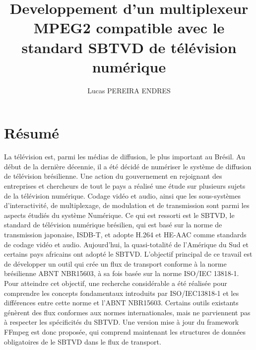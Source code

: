 \documentclass[12pt,a4paper]{article}
\author{Lucas PEREIRA ENDRES}
\title{Developpement d'un multiplexeur MPEG2 compatible avec le standard SBTVD de télévision numérique}
\begin{document}
\TBfrontcover
\newpage
 
\newpage
\section*{Résumé}
La télévision est, parmi les médias de diffusion, le plus important au Brésil. Au début de la dernière décennie, il a été décidé de numériser le système de diffusion de télévision brésilienne. Une action du gouvernement en rejoignant des entreprises et chercheurs de tout le pays a réalisé une étude sur plusieurs sujets de la télévision
numérique. Codage vidéo et audio, ainsi que les sous-systèmes d’interactivité, de multiplexage, de modulation et de transmission sont parmi les aspects étudiés du
système Numérique. Ce qui est ressorti est le SBTVD, le standard de télévision numérique brésilien, qui est basé sur la norme de transmission japonaise, ISDB-T, et
adopte H.264 et HE-AAC comme standards de codage vidéo et audio. Aujourd’hui, la quasi-totalité de l’Amérique du Sud et certains pays africains ont adopté le SBTVD.
L’objectif principal de ce travail est de développer un outil qui crée un flux de transport conforme à la norme brésilienne ABNT NBR15603, à sa fois basée sur la
norme ISO/IEC 13818-1. Pour atteindre cet objectif, une recherche considérable a été réalisée pour comprendre les concepts fondamentaux introduits par ISO/IEC13818-1
et les différences entre cette norme et l’ABNT NBR15603. Certains outils existants génèrent des flux conformes aux normes internationales, mais ne parviennent pas à respecter les spécificités du SBTVD. Une version mise à jour du framework FFmpeg est donc proposée, qui comprend maintenant les structures de données obligatoires
de le SBTVD dans le flux de transport.

\newpage
\end{document}
